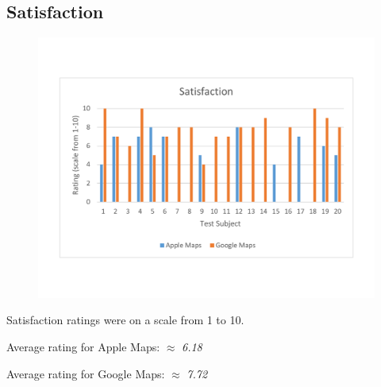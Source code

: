 \documentclass[a4paper; 11pt]{article}
\begin{document}
\subsection{Satisfaction}
\begin{figure}[ht]
\begin{center}
\includegraphics[keepaspectratio, width=.8\textwidth ]{satisfaction.pdf}
\end{center}
\end{figure}
\par
Satisfaction ratings were on a scale from 1 to 10.
\par
Average rating for Apple Maps: $ \approx $ \textit{6.18}
\par
Average rating for Google Maps: $ \approx $ \textit{7.72}
\end{document}
